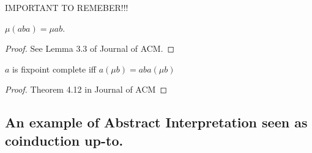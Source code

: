 \documentclass{llncs}
\begin{document}
%
%
%
%
%


IMPORTANT TO REMEBER!!! 
\begin{lemma}
$\mu(aba) = \mu ab$.
\end{lemma}
\begin{proof}
See Lemma 3.3 of Journal of ACM.
\end{proof}

\begin{proposition}
$a$ is fixpoint complete iff $a(\mu b) = aba(\mu b)$
\end{proposition}
\begin{proof}
Theorem 4.12 in Journal of ACM
\end{proof}

\subsection{An example of Abstract Interpretation seen as coinduction up-to.}
\end{document}
